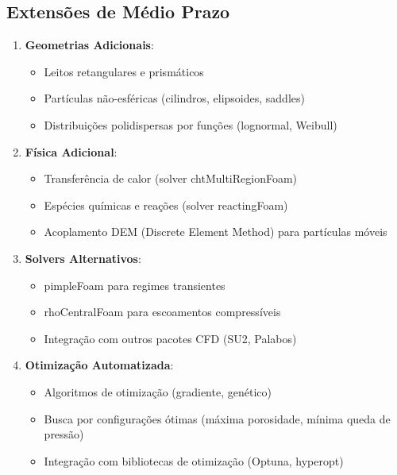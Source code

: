 \subsection{Extensões de Médio Prazo}

\begin{enumerate}
    \item \textbf{Geometrias Adicionais}:
    \begin{itemize}
        \item Leitos retangulares e prismáticos
        \item Partículas não-esféricas (cilindros, elipsoides, saddles)
        \item Distribuições polidispersas por funções (lognormal, Weibull)
    \end{itemize}
    
    \item \textbf{Física Adicional}:
    \begin{itemize}
        \item Transferência de calor (solver chtMultiRegionFoam)
        \item Espécies químicas e reações (solver reactingFoam)
        \item Acoplamento DEM (Discrete Element Method) para partículas móveis
    \end{itemize}
    
    \item \textbf{Solvers Alternativos}:
    \begin{itemize}
        \item pimpleFoam para regimes transientes
        \item rhoCentralFoam para escoamentos compressíveis
        \item Integração com outros pacotes CFD (SU2, Palabos)
    \end{itemize}
    
    \item \textbf{Otimização Automatizada}:
    \begin{itemize}
        \item Algoritmos de otimização (gradiente, genético)
        \item Busca por configurações ótimas (máxima porosidade, mínima queda de pressão)
        \item Integração com bibliotecas de otimização (Optuna, hyperopt)
    \end{itemize}
\end{enumerate}

